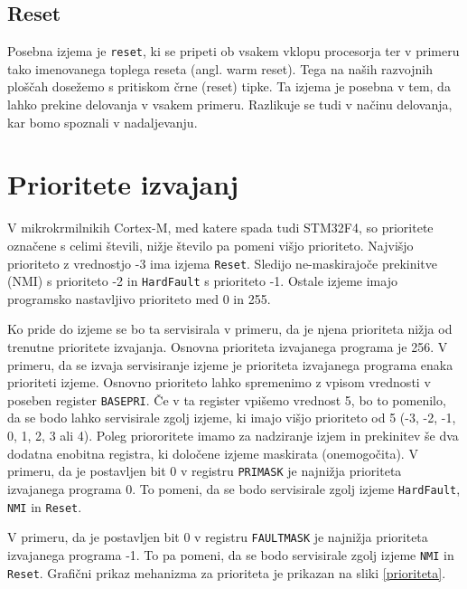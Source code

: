\documentclass[12pt,letterpaper]{article}
\begin{document}
\subsection*{Reset}

Posebna izjema je \texttt{reset}, ki se pripeti ob vsakem vklopu procesorja ter v primeru tako imenovanega toplega reseta (angl. warm reset). Tega na naših razvojnih ploščah dosežemo s pritiskom črne (reset) tipke. Ta izjema je posebna v tem, da lahko prekine delovanja v vsakem primeru. Razlikuje se tudi v načinu delovanja, kar bomo spoznali v nadaljevanju.


\section*{Prioritete izvajanj}

V mikrokrmilnikih Cortex-M, med katere spada tudi STM32F4, so prioritete označene s celimi števili, nižje število pa pomeni višjo prioriteto. Najvišjo prioriteto z vrednostjo -3 ima izjema \texttt{Reset}. Sledijo ne-maskirajoče prekinitve (NMI) s prioriteto -2 in \texttt{HardFault} s prioriteto -1. Ostale izjeme imajo programsko nastavljivo prioriteto med 0 in 255.

Ko pride do izjeme se bo ta servisirala v primeru, da je njena prioriteta nižja od trenutne prioritete izvajanja. Osnovna prioriteta izvajanega programa je 256. V primeru, da se izvaja servisiranje izjeme je prioriteta izvajanega programa enaka prioriteti izjeme. Osnovno prioriteto lahko spremenimo z vpisom vrednosti v poseben register \texttt{BASEPRI}. Če v ta register vpišemo vrednost 5, bo to pomenilo, da se bodo lahko servisirale zgolj izjeme, ki imajo višjo prioriteto od 5 (-3, -2, -1, 0, 1, 2, 3 ali 4). 
Poleg priororitete imamo za nadziranje izjem in prekinitev še dva dodatna enobitna registra, ki določene izjeme maskirata (onemogočita). V primeru, da je postavljen bit 0 v registru \texttt{PRIMASK} je najnižja prioriteta izvajanega programa 0. To pomeni, da se bodo servisirale zgolj izjeme \texttt{HardFault}, \texttt{NMI} in \texttt{Reset}.

V primeru, da je postavljen bit 0 v registru \texttt{FAULTMASK} je najnižja prioriteta izvajanega programa -1. To pa pomeni, da se bodo servisirale zgolj izjeme \texttt{NMI} in \texttt{Reset}. Grafični prikaz mehanizma za prioriteta je prikazan na sliki \ref{prioriteta}. 
\end{document}
